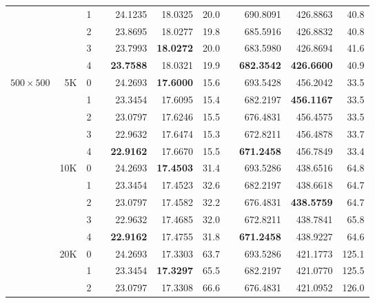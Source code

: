 \begin{table}[p!]
{\begin{tabular*}{\hsize}{crrlrrrlrrr}
                &     & 1 &  &      24.1235  &      18.0325  &  20.0 &  &      690.8091  &      426.8863  &  40.8 \\
                &     & 2 &  &      23.8695  &      18.0277  &  19.8 &  &      685.5916  &      426.8832  &  40.8 \\
                &     & 3 &  &      23.7993  & {\bf 18.0272} &  20.0 &  &      683.5980  &      426.8694  &  41.6 \\
                &     & 4 &  & {\bf 23.7588} &      18.0321  &  19.9 &  & {\bf 682.3542} & {\bf 426.6600} &  40.9 \\
\hline
$500\times 500$ &  5K & 0 &  &      24.2693  & {\bf 17.6000} &  15.6 &  &      693.5428  &      456.2042  &  33.5 \\
                &     & 1 &  &      23.3454  &      17.6095  &  15.4 &  &      682.2197  & {\bf 456.1167} &  33.5 \\
                &     & 2 &  &      23.0797  &      17.6246  &  15.5 &  &      676.4831  &      456.4575  &  33.5 \\
                &     & 3 &  &      22.9632  &      17.6474  &  15.3 &  &      672.8211  &      456.4878  &  33.7 \\
                &     & 4 &  & {\bf 22.9162} &      17.6670  &  15.5 &  & {\bf 671.2458} &      456.7849  &  33.4 \\
\cline{2-11}
                & 10K & 0 &  &      24.2693  & {\bf 17.4503} &  31.4 &  &      693.5286  &      438.6516  &  64.8 \\
                &     & 1 &  &      23.3454  &      17.4523  &  32.6 &  &      682.2197  &      438.6618  &  64.7 \\
                &     & 2 &  &      23.0797  &      17.4582  &  32.2 &  &      676.4831  & {\bf 438.5759} &  64.7 \\
                &     & 3 &  &      22.9632  &      17.4685  &  32.0 &  &      672.8211  &      438.7841  &  65.8 \\
                &     & 4 &  & {\bf 22.9162} &      17.4755  &  31.8 &  & {\bf 671.2458} &      438.9227  &  64.6 \\
\cline{2-11}
                & 20K & 0 &  &      24.2693  &      17.3303  &  63.7 &  &      693.5286  &      421.1773  & 125.1 \\
                &     & 1 &  &      23.3454  & {\bf 17.3297} &  65.5 &  &      682.2197  &      421.0770  & 125.5 \\
                &     & 2 &  &      23.0797  &      17.3308  &  66.6 &  &      676.4831  &      421.0952  & 126.0 \\

\end{tabular*}}
\end{table}
